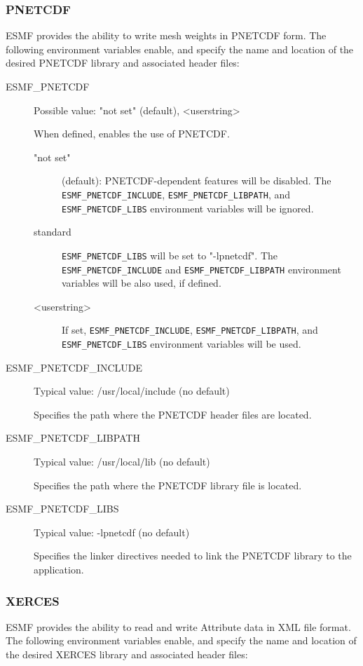 \subsubsection{PNETCDF}
\label{sec:pnetcdf}
ESMF provides the ability to write mesh weights in PNETCDF form.  The
following environment variables enable, and specify the name and location
of the desired PNETCDF library and associated header files:

\begin{description}
\item[ESMF\_PNETCDF] Possible value: "not set" (default), <userstring>

When defined, enables the use of PNETCDF.

\begin{description}
\item["not set"] (default): PNETCDF-dependent features will be disabled.
The {\tt ESMF\_PNETCDF\_INCLUDE}, {\tt ESMF\_PNETCDF\_LIBPATH}, and
{\tt ESMF\_PNETCDF\_LIBS} environment variables will be ignored.

\item[standard] {\tt ESMF\_PNETCDF\_LIBS} will be set to "-lpnetcdf".  
The {\tt ESMF\_PNETCDF\_INCLUDE} and {\tt ESMF\_PNETCDF\_LIBPATH}
environment variables will be also used, if defined.

\item[<userstring>] If set, {\tt ESMF\_PNETCDF\_INCLUDE},
{\tt ESMF\_PNETCDF\_LIBPATH}, and {\tt ESMF\_PNETCDF\_LIBS} environment
variables will be used.
\end{description}

\item[ESMF\_PNETCDF\_INCLUDE] Typical value: /usr/local/include (no default)

Specifies the path where the PNETCDF header files are located.

\item[ESMF\_PNETCDF\_LIBPATH] Typical value: /usr/local/lib (no default)

Specifies the path where the PNETCDF library file is located.

\item[ESMF\_PNETCDF\_LIBS] Typical value: -lpnetcdf (no default)

Specifies the linker directives needed to link the PNETCDF library to the
application.
\end{description}

\subsubsection{XERCES}
\label{sec:xerces}
ESMF provides the ability to read and write Attribute data in XML file format.
The following environment variables enable, and specify the name and location
of the desired XERCES library and associated header files:

